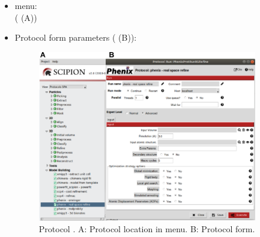 \begin{itemize}
 \item \scipion menu:\\
   ( (A))\\
  
 \item Protocol form parameters ( (B)):\\
  
    \begin{figure}[H]
     \centering 
     \captionsetup{width=.7\linewidth} 
     \includegraphics[width=0.90\textwidth]{Images_appendix/Fig148.pdf}
     \caption{Protocol . A: Protocol location in \scipion menu. B: Protocol form.}
     \label{fig:app_protocol_real_space_refine_1}
    \end{figure}
    

\end{itemize}

